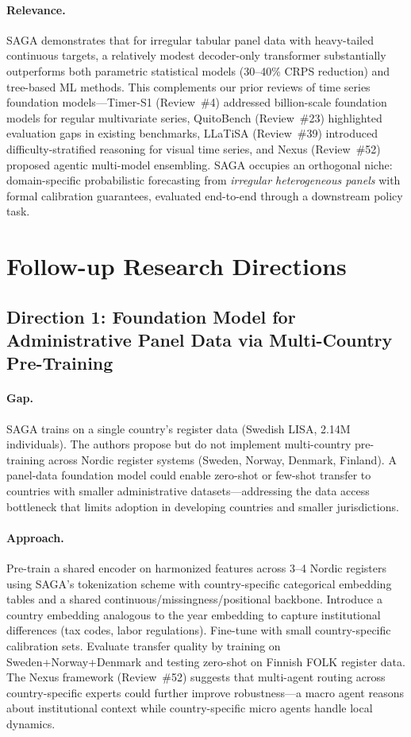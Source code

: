 \documentclass[11pt,a4paper]{article}
\begin{document}
\paragraph{Relevance.}
SAGA demonstrates that for irregular tabular panel data with heavy-tailed continuous targets, a relatively modest decoder-only transformer substantially outperforms both parametric statistical models (30--40\% CRPS reduction) and tree-based ML methods. This complements our prior reviews of time series foundation models---Timer-S1 (Review~\#4) addressed billion-scale foundation models for regular multivariate series, QuitoBench (Review~\#23) highlighted evaluation gaps in existing benchmarks, LLaTiSA (Review~\#39) introduced difficulty-stratified reasoning for visual time series, and Nexus (Review~\#52) proposed agentic multi-model ensembling. SAGA occupies an orthogonal niche: domain-specific probabilistic forecasting from \emph{irregular heterogeneous panels} with formal calibration guarantees, evaluated end-to-end through a downstream policy task.

\section*{Follow-up Research Directions}

\subsection*{Direction 1: Foundation Model for Administrative Panel Data via Multi-Country Pre-Training}

\paragraph{Gap.}
SAGA trains on a single country's register data (Swedish LISA, 2.14M individuals). The authors propose but do not implement multi-country pre-training across Nordic register systems (Sweden, Norway, Denmark, Finland). A panel-data foundation model could enable zero-shot or few-shot transfer to countries with smaller administrative datasets---addressing the data access bottleneck that limits adoption in developing countries and smaller jurisdictions.

\paragraph{Approach.}
Pre-train a shared encoder on harmonized features across 3--4 Nordic registers using SAGA's tokenization scheme with country-specific categorical embedding tables and a shared continuous/missingness/positional backbone. Introduce a country embedding analogous to the year embedding to capture institutional differences (tax codes, labor regulations). Fine-tune with small country-specific calibration sets. Evaluate transfer quality by training on Sweden+Norway+Denmark and testing zero-shot on Finnish FOLK register data. The Nexus framework (Review~\#52) suggests that multi-agent routing across country-specific experts could further improve robustness---a macro agent reasons about institutional context while country-specific micro agents handle local dynamics.
\end{document}
